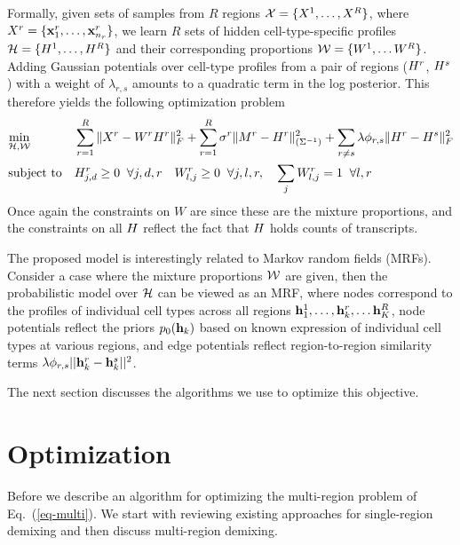 \documentclass{article} %
\newcommand{\W}{W}
\renewcommand{\eqref}[1]{Eq.~(\ref{#1})}
\begin{document}
Formally, given sets of samples from $R$ regions ${\cal{X}} = \{X^1,\ldots, X^R\}$, where $X^r = \{\mathbf{x}^r_1, \ldots, \mathbf{x}^r_{n_r} \}$, we learn $R$ sets of hidden cell-type-specific profiles ${\cal{{H}}} = \{{H}^1,\ldots, {H}^R\}$ and their corresponding proportions ${\cal{W}} = \{ W^1,\ldots W^R\}$. Adding Gaussian potentials over cell-type profiles from a pair of regions (${H}^r$, ${H}^s$) with a weight of $\lambda_{r,s}$ amounts to a quadratic term in the log posterior. This therefore yields the following optimization problem
\begin{equation}
    \label{eq-multi}
    \begin{aligned}
        & \underset{\cal{{H}},\cal{W}}{\text{min}}  
        & & \sum_{r=1}^R  \| X^r - W^r {H}^r \|_F^2
        + \sum_{r=1}^R  \sigma^r \| M^r - {H}^r \|^2_{(\Sigma^{-1})}  
        + \sum_{r \neq s} \lambda \phi_{r , s} \| {H}^r - {H}^s \|_F^2  \\
        & \text{subject to} &
            & H^r_{j,d} \geq 0 \;\;\forall j, d, r \quad W^r_{l,j} \geq 0 \;\; \forall j, l, r , \quad \sum_j W^r_{l,j} = 1 \;\; \forall l,r \\
    \end{aligned}
\end{equation}
Once again the constraints on $\W$ are since these are the mixture proportions, and the constraints on all ${H}$ reflect the fact that ${H}$ holds counts of transcripts.

The proposed model is interestingly related to Markov random fields (MRFs). Consider a case where the mixture proportions $\cal{W}$ are given, then the probabilistic model over $\cal{{H}}$ can be viewed as an MRF, where nodes correspond to the profiles of individual cell types across all regions $\mathbf{h}^1_1,\ldots, \mathbf{h}^r_k, \ldots \mathbf{h}^R_K$, node potentials reflect the priors $p_0(\mathbf{h}_k)$ based on known expression of individual cell types at various regions, and edge potentials reflect region-to-region similarity terms $\lambda \phi_{r,s}|| \mathbf{h}^r_k - \mathbf{h}^s_k||^2$. 

The next section discusses the algorithms we use to optimize this objective.

\section{Optimization}
Before we describe an algorithm for optimizing the multi-region problem of \eqref{eq-multi}. We start with reviewing existing approaches for single-region demixing and then discuss multi-region demixing. 
\end{document}
